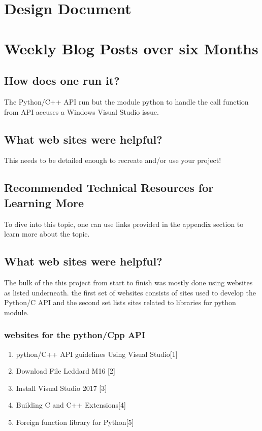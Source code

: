\documentclass[onecolumn, draftclsnofoot,10pt, compsoc]{IEEEtran}
\begin{document}
\section{Design Document}



\section{Weekly Blog Posts over six Months}


\subsection{How does one run it?}
The Python/C++ API run but the module python to handle the call function from API accuses a Windows Visual Studio issue.
 
\subsection{What web sites were helpful?}
This needs to be detailed enough to recreate and/or use your project!\par
\subsection{Recommended Technical Resources for Learning More}
To dive into this topic, one can use links provided in the appendix section to learn more about the topic.

\subsection{What web sites were helpful?}
The bulk of the this project from start to finish was mostly done using websites as listed underneath. the first set of websites consists of sites used to develop the Python/C API and the second set lists sites related to libraries for python module.
\subsubsection{websites for the python/Cpp API}
\begin{enumerate}
\item python/C++ API guidelines Using Visual Studio[1]
\item Download File Leddard M16 [2]
\item Install Visual Studio 2017 [3]
\item Building C and C++ Extensions[4]
\item  Foreign function  library for Python[5]
\end{enumerate}
\end{document}
